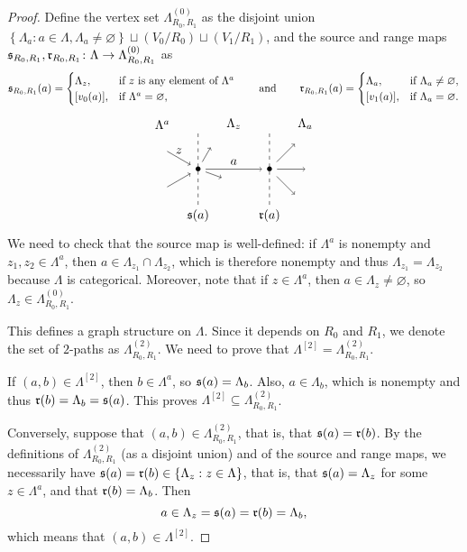 \begin{proof}
Define the vertex set $\Lambda_{R_0,R_1}^{(0)}$ as the disjoint union $\left\{\Lambda_a:a\in\Lambda,\Lambda_a\neq\varnothing\right\}\sqcup(V_0/R_0)\sqcup(V_1/R_1)$, and the source and range maps $\operatorname{\mathfrak{s}}_{R_0,R_1},\operatorname{\mathfrak{r}}_{R_0,R_1}\colon\Lambda\to\Lambda_{R_0,R_1}^{(0)}$ as
\[\operatorname{\mathfrak{s}}_{R_0,R_1}(a)=\begin{cases}
\Lambda_z,&\text{if }z\text{ is any element of } \Lambda^a\\
[v_0(a)],&\text{if }\Lambda^a=\varnothing,
\end{cases}\qquad\text{and}\qquad \operatorname{\mathfrak{r}}_{R_0,R_1}(a)=\begin{cases}
\Lambda_a,&\text{if }\Lambda_a\neq\varnothing,\\
[v_1(a)],&\text{if }\Lambda_a=\varnothing.
\end{cases}
\]
\[\begin{tikzpicture}
\node (Sa) at (0,0) {$\bullet$};
\node (Ra) at (2,0) {$\bullet$};
\draw[->] (Sa)--(Ra) node[above,align=center,midway] {$a$};
\draw[dashed] (Sa)+(-90:1) node[below] {$\so(a)$} -- +(90:1);
\draw[dashed] (Ra)+(-90:1) node[below] {$\ra(a)$}-- +(90:1);
\draw[->] (Sa)--+(60:0.7);
\draw[->] (Sa)--+(-20:0.7);
\node[above] at (1,1) {$\Lambda_z$};
\draw[->] (Ra) -- +(45:1);
\draw[->] (Ra) -- +(-45:1);
\draw[->] (Ra) -- +(0:1);
\draw[->] (Sa)+(150:1) -- (Sa) node[midway,above] {$z$};
\draw[->] (Sa)+(210:1) -- (Sa);
\node[above] at (3,1) {$\Lambda_a$};
\node[above] at (-1,1) {$\Lambda^a$};
\end{tikzpicture}
\]
We need to check that the source map is well-defined: if $\Lambda^a$ is nonempty and $z_1,z_2\in\Lambda^a$, then $a\in\Lambda_{z_1}\cap\Lambda_{z_2}$, which is therefore nonempty and thus $\Lambda_{z_1}=\Lambda_{z_2}$ because $\Lambda$ is categorical. Moreover, note that if $z\in\Lambda^a$, then $a\in\Lambda_z\neq\varnothing$, so $\Lambda_z\in\Lambda_{R_0,R_1}^{(0)}$.

This defines a graph structure on $\Lambda$. Since it depends on $R_0$ and $R_1$, we denote the set of $2$-paths as $\Lambda_{R_0,R_1}^{(2)}$. We need to prove that $\Lambda^{[2]}=\Lambda_{R_0,R_1}^{(2)}$. 

If $(a,b)\in\Lambda^{[2]}$, then $b\in\Lambda^a$, so $\operatorname{\mathfrak{s}}(a)=\Lambda_b$. Also, $a\in\Lambda_b$, which is nonempty and thus $\operatorname{\mathfrak{r}}(b)=\Lambda_b=\operatorname{\mathfrak{s}}(a)$. This proves $\Lambda^{[2]}\subseteq\Lambda_{R_0,R_1}^{(2)}$.

Conversely, suppose that $(a,b)\in\Lambda_{R_0,R_1}^{(2)}$, that is, that $\operatorname{\mathfrak{s}}(a)=\operatorname{\mathfrak{r}}(b)$. By the definitions of $\Lambda_{R_0,R_1}^{(2)}$ (as a disjoint union) and of the source and range maps, we necessarily have $\operatorname{\mathfrak{s}}(a)=\operatorname{\mathfrak{r}}(b)\in\left\{\Lambda_z:z\in\Lambda\right\}$, that is, that $\operatorname{\mathfrak{s}}(a)=\Lambda_z$ for some $z\in\Lambda^a$, and that $\operatorname{\mathfrak{r}}(b)=\Lambda_b$. Then
\[a\in\Lambda_z=\operatorname{\mathfrak{s}}(a)=\operatorname{\mathfrak{r}}(b)=\Lambda_b,\]
which means that $(a,b)\in\Lambda^{[2]}$.


\end{proof}
